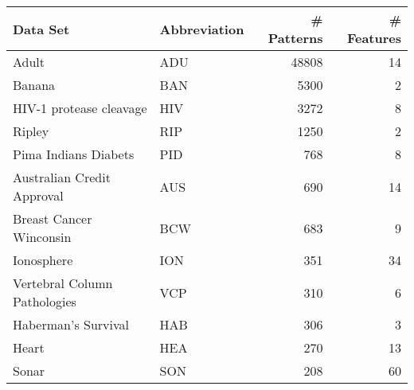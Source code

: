 \begin{tabular}{llrr}
\toprule
  Data Set
&  Abbreviation
& \# Patterns
& \# Features \\
\midrule
Adult									        &   ADU   &     48808 & 14 \\ 
Banana									      & 	BAN   & 	  5300  & 2  \\ 
HIV-1 protease cleavage 			&   HIV   &     3272  & 8  \\ 
Ripley 						   	     		&   RIP   &     1250  & 2  \\ 
Pima Indians Diabets    			&   PID   &     768   & 8  \\ 
Australian Credit Approval    &   AUS   &     690   & 14 \\ 
Breast Cancer Winconsin  	   	&   BCW   &     683   & 9  \\ 
Ionosphere   				   			  &   ION   &     351   & 34 \\ 
Vertebral Column Pathologies  &   VCP   &     310   & 6  \\ 
Haberman's Survival			   		&   HAB   &     306   & 3  \\ 
Heart						   			      &   HEA   &     270   & 13 \\ 
Sonar   					   			    &   SON   &     208   & 60 \\ \bottomrule
\end{tabular}